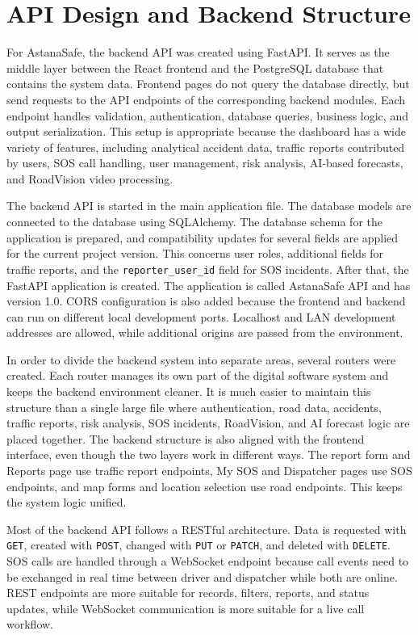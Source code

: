 ﻿\documentclass[12pt,a4paper]{report}
\begin{document}
\section{API Design and Backend Structure}

For AstanaSafe, the backend API was created using FastAPI. It serves as the middle layer between the React frontend and the PostgreSQL database that contains the system data. Frontend pages do not query the database directly, but send requests to the API endpoints of the corresponding backend modules. Each endpoint handles validation, authentication, database queries, business logic, and output serialization. This setup is appropriate because the dashboard has a wide variety of features, including analytical accident data, traffic reports contributed by users, SOS call handling, user management, risk analysis, AI-based forecasts, and RoadVision video processing.

The backend API is started in the main application file. The database models are connected to the database using SQLAlchemy. The database schema for the application is prepared, and compatibility updates for several fields are applied for the current project version. This concerns user roles, additional fields for traffic reports, and the \texttt{reporter\_user\_id} field for SOS incidents. After that, the FastAPI application is created. The application is called AstanaSafe API and has version 1.0. CORS configuration is also added because the frontend and backend can run on different local development ports. Localhost and LAN development addresses are allowed, while additional origins are passed from the environment.

In order to divide the backend system into separate areas, several routers were created. Each router manages its own part of the digital software system and keeps the backend environment cleaner. It is much easier to maintain this structure than a single large file where authentication, road data, accidents, traffic reports, risk analysis, SOS incidents, RoadVision, and AI forecast logic are placed together. The backend structure is also aligned with the frontend interface, even though the two layers work in different ways. The report form and Reports page use traffic report endpoints, My SOS and Dispatcher pages use SOS endpoints, and map forms and location selection use road endpoints. This keeps the system logic unified.

Most of the backend API follows a RESTful architecture. Data is requested with \texttt{GET}, created with \texttt{POST}, changed with \texttt{PUT} or \texttt{PATCH}, and deleted with \texttt{DELETE}. SOS calls are handled through a WebSocket endpoint because call events need to be exchanged in real time between driver and dispatcher while both are online. REST endpoints are more suitable for records, filters, reports, and status updates, while WebSocket communication is more suitable for a live call workflow.
\end{document}
